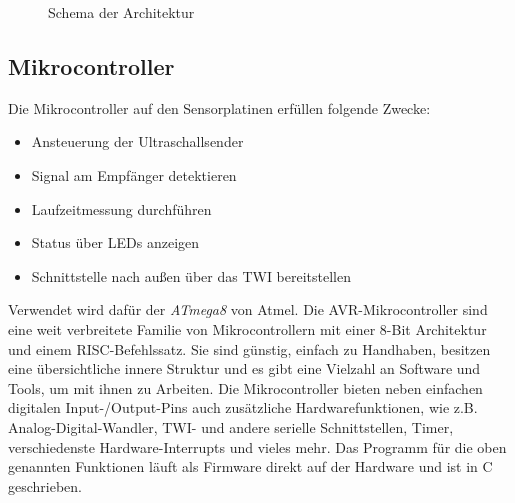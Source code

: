 \begin{figure}[H]
\caption{Schema der Architektur} \label{fig:ARCH}
\end{figure}


\subsection{Mikrocontroller}
Die Mikrocontroller auf den Sensorplatinen erfüllen folgende Zwecke:
\begin{itemize}
	\item Ansteuerung der Ultraschallsender
	\item Signal am Empfänger detektieren
	\item Laufzeitmessung durchführen
	\item Status über LEDs anzeigen
	\item Schnittstelle nach außen über das \ac{TWI} bereitstellen
\end{itemize}
Verwendet wird dafür der \textit{ATmega8} von Atmel. Die AVR-Mikrocontroller sind eine weit verbreitete Familie von
Mikrocontrollern mit einer 8-Bit Architektur und einem \ac{RISC}-Befehlssatz. Sie sind günstig, einfach zu Handhaben, besitzen eine übersichtliche innere Struktur und es gibt eine Vielzahl an Software und Tools, um mit ihnen zu Arbeiten. Die Mikrocontroller bieten neben einfachen digitalen Input-/Output-Pins auch zusätzliche Hardwarefunktionen, wie z.B. Analog-Digital-Wandler, \ac{TWI}- und andere serielle Schnittstellen, Timer, verschiedenste Hardware-Interrupts und vieles mehr. Das Programm für die oben genannten Funktionen läuft als Firmware direkt auf der Hardware und ist in C geschrieben.


